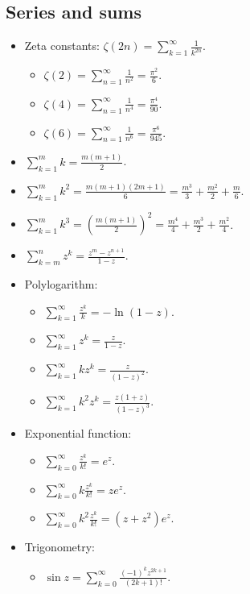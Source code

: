 \subsection{Series and sums}

\begin{itemize}
    \item Zeta constants: $\zeta(2n) = \sum_{k=1}^\infty \frac1{k^{2n}}$.
    \begin{itemize}
        \item $\zeta(2) = \sum_{n=1}^\infty \frac1{n^2} = \frac{\pi^2}6$.
        \item $\zeta(4) = \sum_{n=1}^\infty \frac1{n^4} = \frac{\pi^4}{90}$.
        \item $\zeta(6) = \sum_{n=1}^\infty \frac1{n^6} = \frac{\pi^6}{945}$.
    \end{itemize}
    \item $\sum_{k=1}^m k = \frac{m(m+1)}2$.
    \item $\sum_{k=1}^m k^2 = \frac{m(m+1)(2m + 1)} 6 = \frac{m^3}3 + \frac{m^2}2 + \frac m6$.
    \item $\sum_{k=1}^m k^3 = \left(\frac{m(m+1)}2\right)^2 = \frac{m^4}4 + \frac{m^3}2 + \frac{m^2}4$.
    \item $\sum_{k=m}^n z^k = \frac{z^m - z^{n+1}}{1 - z}$.
    \item Polylogarithm:
    \begin{itemize}
        \item $\sum_{k=1}^\infty \frac{z^k}k = -\ln(1 - z)$.
        \item $\sum_{k=1}^\infty z^k = \frac z{1 - z}$.
        \item $\sum_{k=1}^\infty kz^k = \frac z{(1 - z)^2}$.
        \item $\sum_{k=1}^\infty k^2z^k = \frac {z(1 + z)}{(1 - z)^3}$.
    \end{itemize}
    \item Exponential function:
    \begin{itemize}
        \item $\sum_{k=0}^\infty \frac{z^k}{k!} = e^z$.
        \item $\sum_{k=0}^\infty k\frac{z^k}{k!} = ze^z$.
        \item $\sum_{k=0}^\infty k^2\frac{z^k}{k!} = (z + z^2)e^z$.
    \end{itemize}
    \item Trigonometry:
    \begin{itemize}
        \item $\sin z = \sum_{k=0}^\infty \frac{(-1)^k z^{2k + 1}}{(2k + 1)!}$.

\end{itemize}
\end{itemize}
